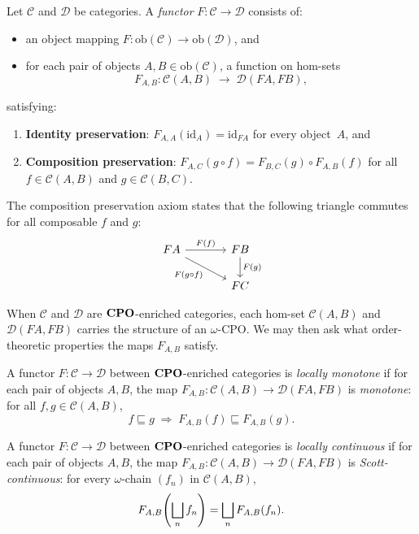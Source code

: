 \begin{definition}[Functor]
\label{def:functor}
Let $\mathcal{C}$ and $\mathcal{D}$ be categories. A \emph{functor}
$F : \mathcal{C} \to \mathcal{D}$ consists of:
\begin{itemize}
  \item an object mapping
        $F : \mathrm{ob}(\mathcal{C}) \to \mathrm{ob}(\mathcal{D})$, and
  \item for each pair of objects $A, B \in \mathrm{ob}(\mathcal{C})$, a
        function on hom-sets
        \[
          F_{A,B} : \mathcal{C}(A, B) \;\longrightarrow\;
            \mathcal{D}(FA, FB),
        \]
\end{itemize}
satisfying:
\begin{enumerate}
  \item \textbf{Identity preservation}:
        $F_{A,A}(\mathrm{id}_A) = \mathrm{id}_{FA}$ for every
        object~$A$, and
  \item \textbf{Composition preservation}:
        $F_{A,C}(g \circ f) = F_{B,C}(g) \circ F_{A,B}(f)$
        for all $f \in \mathcal{C}(A,B)$ and $g \in \mathcal{C}(B,C)$.
\end{enumerate}
\end{definition}

The composition preservation axiom states that the following triangle
commutes for all composable $f$ and $g$:
\[
\begin{tikzcd}[column sep=large]
FA \arrow[r, "F(f)"] \arrow[dr, "F(g \circ f)"'] & FB \arrow[d, "F(g)"] \\
& FC
\end{tikzcd}
\]

When $\mathcal{C}$ and $\mathcal{D}$ are $\mathbf{CPO}$-enriched categories, each
hom-set $\mathcal{C}(A,B)$ and $\mathcal{D}(FA,FB)$ carries the structure
of an $\omega$-CPO. We may then ask what order-theoretic properties the
maps $F_{A,B}$ satisfy.

\begin{definition}
\label{def:locally-monotone}
A functor $F : \mathcal{C} \to \mathcal{D}$ between $\mathbf{CPO}$-enriched
categories is \emph{locally monotone} if for each pair of objects $A, B$,
the map
$F_{A,B} : \mathcal{C}(A,B) \to \mathcal{D}(FA,FB)$
is \emph{monotone}: for all $f, g \in \mathcal{C}(A,B)$,
\[
  f \sqsubseteq g \;\Longrightarrow\; F_{A,B}(f) \sqsubseteq F_{A,B}(g).
\]
\end{definition}

\begin{definition}
\label{def:lc-functor}
A functor $F : \mathcal{C} \to \mathcal{D}$ between $\mathbf{CPO}$-enriched
categories is \emph{locally continuous} if for each pair of objects
$A, B$, the map
$F_{A,B} : \mathcal{C}(A,B) \to \mathcal{D}(FA,FB)$
is \emph{Scott-continuous}: for every $\omega$-chain $(f_n)$ in
$\mathcal{C}(A,B)$,
\[
  F_{A,B}\!\left(\bigsqcup_n f_n\right) = \bigsqcup_n F_{A,B}(f_n).
\]
\end{definition}

